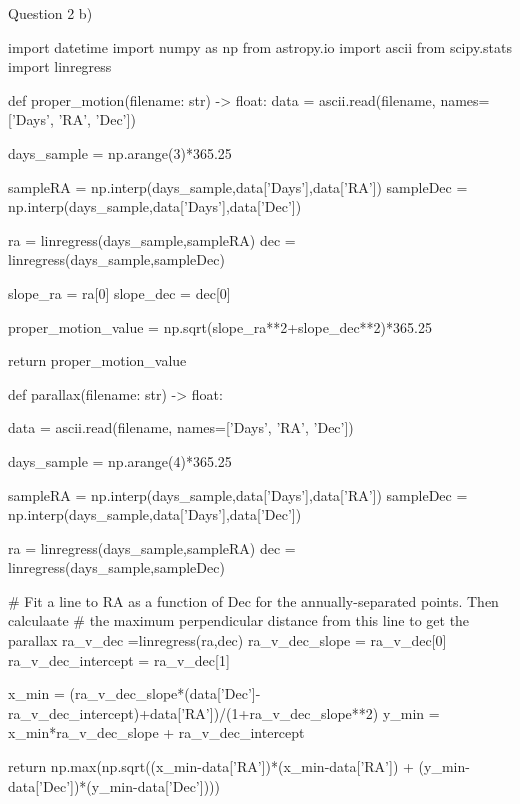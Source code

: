 \documentclass{article}
\begin{document}
Question 2 b)
\begin{equation}
   \label{code: 2)b)} 
\end{equation}
\begin{python}

import datetime
import numpy as np
from astropy.io import ascii
from scipy.stats import linregress


def proper_motion(filename: str) -> float:
    data = ascii.read(filename, names=['Days', 'RA', 'Dec'])

    days_sample = np.arange(3)*365.25

    sampleRA = np.interp(days_sample,data['Days'],data['RA'])
    sampleDec = np.interp(days_sample,data['Days'],data['Dec'])

    ra = linregress(days_sample,sampleRA)
    dec = linregress(days_sample,sampleDec)

    slope_ra = ra[0]
    slope_dec = dec[0]

    proper_motion_value = np.sqrt(slope_ra**2+slope_dec**2)*365.25
    
    return proper_motion_value
    
    
def parallax(filename: str) -> float:

    data = ascii.read(filename, names=['Days', 'RA', 'Dec'])

    days_sample = np.arange(4)*365.25

    sampleRA = np.interp(days_sample,data['Days'],data['RA'])
    sampleDec = np.interp(days_sample,data['Days'],data['Dec'])

    ra = linregress(days_sample,sampleRA)
    dec = linregress(days_sample,sampleDec)

    # Fit a line to RA as a function of Dec for the annually-separated points.  Then calculaate 
    # the maximum perpendicular distance from this line to get the parallax	
    ra_v_dec =linregress(ra,dec)
    ra_v_dec_slope = ra_v_dec[0]
    ra_v_dec_intercept = ra_v_dec[1]

    x_min = (ra_v_dec_slope*(data['Dec']-ra_v_dec_intercept)+data['RA'])/(1+ra_v_dec_slope**2)
    y_min = x_min*ra_v_dec_slope + ra_v_dec_intercept

    return np.max(np.sqrt((x_min-data['RA'])*(x_min-data['RA']) + (y_min-data['Dec'])*(y_min-data['Dec'])))
\end{python}
\end{document}
